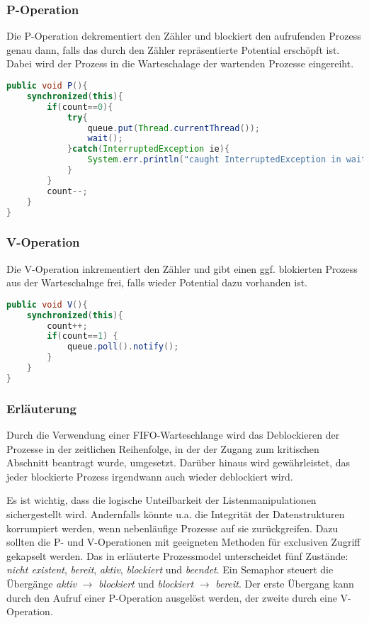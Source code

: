 \documentclass[11pt,a4paper,DIV=10,]{scrartcl}
\begin{document}
\subsubsection*{P-Operation}
Die P-Operation dekrementiert den Zähler und blockiert den aufrufenden Prozess genau dann, falls das durch den Zähler repräsentierte Potential erschöpft ist. Dabei wird der Prozess in die Warteschalage der wartenden Prozesse eingereiht.
\begin{lstlisting}[language=JAVA]
public void P(){
	synchronized(this){
		if(count==0){
			try{
				queue.put(Thread.currentThread());
				wait();
			}catch(InterruptedException ie){
				System.err.println("caught InterruptedException in wait()");
			}
		}
		count--;
	}
}
\end{lstlisting}
\subsubsection*{V-Operation}
Die V-Operation inkrementiert den Zähler und gibt einen ggf. blokierten Prozess aus der Warteschalnge frei, falls wieder Potential dazu vorhanden ist.
\begin{lstlisting}[language=JAVA]
public void V(){
	synchronized(this){
		count++;
		if(count==1) {
			queue.poll().notify();
		}
	}
}
\end{lstlisting}
\subsubsection*{Erläuterung}
Durch die Verwendung einer FIFO-Warteschlange wird das Deblockieren der Prozesse in der zeitlichen Reihenfolge, in der der Zugang zum kritischen Abschnitt beantragt wurde, umgesetzt. Darüber hinaus wird gewährleistet, das jeder blockierte Prozess irgendwann auch wieder deblockiert wird. 

Es ist wichtig, dass die logische Unteilbarkeit der Listenmanipulationen sichergestellt wird. Andernfalls könnte u.a. die Integrität der Datenstrukturen korrumpiert werden, wenn nebenläufige Prozesse auf sie zurückgreifen. Dazu sollten die P- und V-Operationen mit geeigneten Methoden für exclusiven Zugriff gekapselt werden.
Das in \citep{Maurer.2012} erläuterte Prozessmodel unterscheidet fünf Zustände: \textit{nicht existent}, \textit{bereit}, \textit{aktiv}, \textit{blockiert} und \textit{beendet}. Ein Semaphor steuert die Übergänge \textit{aktiv} $\rightarrow$ \textit{blockiert} und \textit{blockiert} $\rightarrow$ \textit{bereit}. Der erste Übergang kann durch den Aufruf einer P-Operation ausgelöst werden, der zweite durch eine V-Operation.
\end{document}
